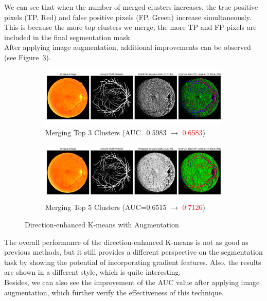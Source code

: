 \documentclass[12pt,letterpaper]{article}
\begin{document}
\noindent
We can see that when the number of merged clusters increases, the true positive pixels (TP, Red) and false positive pixels (FP, Green) increase simultaneously. This is because the more top clusters we merge, the more TP and FP pixels are included in the final segmentation mask. \\ 
After applying image augmentation, additional improvements can be observed (see Figure~\ref{fig:de_aug}).
\begin{figure}[H]
    \centering
    \begin{subfigure}[H]{\textwidth}
        \centering
        \includegraphics[scale=0.35]{Figures/6 Directed (Merge 3 Clusters).png}
        \vspace{-0.5cm}
        \caption{Merging Top 3 Clusters (AUC=0.5983 $\rightarrow$ \textcolor{red}{0.6583})}
        \label{fig:de_aug3}
    \end{subfigure}
    \begin{subfigure}[H]{\textwidth}
        \centering
        \includegraphics[scale=0.35]{Figures/6 Directed (Merge 5 Clusters).png}
        \vspace{-0.5cm}
        \caption{Merging Top 5 Clusters (AUC=0.6515 $\rightarrow$ \textcolor{red}{0.7126})}
        \label{fig:de_aug5}
    \end{subfigure}
    \caption{Direction-enhanced K-means with Augmentation}
    \label{fig:de_aug}
\end{figure}
\noindent
The overall performance of the direction-enhanced K-means is not as good as previous methods, but it still provides a different perspective on the segmentation task by showing the potential of incorporating gradient features. Also, the results are shown in a different style, which is quite interesting. \\
Besides, we can also see the improvement of the AUC value after applying image augmentation, which further verify the effectiveness of this technique. 
\end{document}

